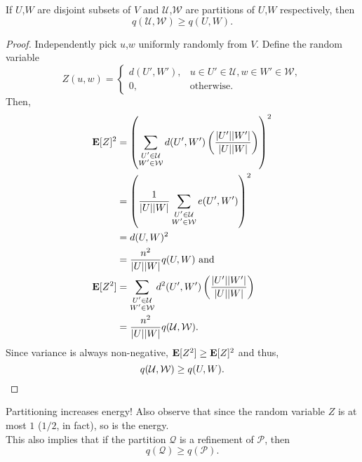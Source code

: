 			\begin{lemma}
				\label{lemma: szemeredi lemma energy increases on partitioning}
				If $U$,$W$ are disjoint subsets of $V$ and $\mathcal{U}$,$\mathcal{W}$ are partitions of $U$,$W$ respectively, then
				\[ q(\mathcal{U},\mathcal{W}) \ge q(U,W). \]
			\end{lemma}

			\begin{proof}
				Independently pick $u$,$w$ uniformly randomly from $V$. Define the random variable
				\[ Z(u,w) =
				\begin{cases}
					d(U', W'), & u \in U' \in \mathcal{U}, w \in W' \in \mathcal{W}, \\
					0, & \text{otherwise.}
				\end{cases}
				\]
				Then,
				\begin{align*}
					\textbf{E}[Z]^2 &= \left(\sum_{\substack{U' \in \mathcal{U} \\ W' \in \mathcal{W}}} d(U',W') \left(\frac{|U'||W'|}{|U||W|}\right)\right)^2 \\
						&= \left(\frac{1}{|U||W|} \sum_{\substack{U' \in \mathcal{U} \\ W' \in \mathcal{W}}} e(U',W')\right)^2 \\
						&= d(U,W)^2 \\
						&= \frac{n^2}{|U||W|} q(U,W) \text{ and} \\
					\textbf{E}[Z^2] &= \sum_{\substack{U' \in \mathcal{U} \\ W' \in \mathcal{W}}} d^2(U',W') \left(\frac{|U'||W'|}{|U||W|}\right) \\
						&= \frac{n^2}{|U||W|} q(\mathcal{U},\mathcal{W}).
				\end{align*}
				Since variance is always non-negative, $\textbf{E}[Z^2] \ge \textbf{E}[Z]^2$ and thus,
				\[ q(\mathcal{U},\mathcal{W}) \ge q(U,W). \qedhere \]
			\end{proof}

			Partitioning increases energy! Also observe that since the random variable $Z$ is at most $1$ ($1/2$, in fact), so is the energy.\\
			This also implies that if the partition $\mathcal{Q}$ is a refinement of $\mathcal{P}$, then
			\[ q(\mathcal{Q}) \ge q(\mathcal{P}). \]

